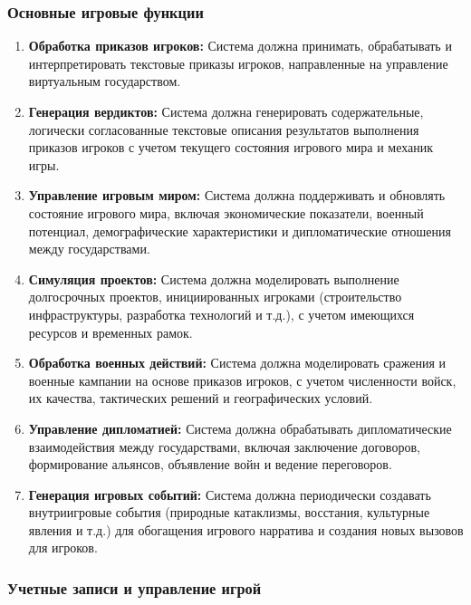 \subsubsection{Основные игровые функции}

\begin{enumerate}[label=FR\arabic*.]
    \item \textbf{Обработка приказов игроков:} Система должна принимать, обрабатывать и интерпретировать текстовые приказы игроков, направленные на управление виртуальным государством.

    \item \textbf{Генерация вердиктов:} Система должна генерировать содержательные, логически согласованные текстовые описания результатов выполнения приказов игроков с учетом текущего состояния игрового мира и механик игры.

    \item \textbf{Управление игровым миром:} Система должна поддерживать и обновлять состояние игрового мира, включая экономические показатели, военный потенциал, демографические характеристики и дипломатические отношения между государствами.

    \item \textbf{Симуляция проектов:} Система должна моделировать выполнение долгосрочных проектов, инициированных игроками (строительство инфраструктуры, разработка технологий и т.д.), с учетом имеющихся ресурсов и временных рамок.

    \item \textbf{Обработка военных действий:} Система должна моделировать сражения и военные кампании на основе приказов игроков, с учетом численности войск, их качества, тактических решений и географических условий.

    \item \textbf{Управление дипломатией:} Система должна обрабатывать дипломатические взаимодействия между государствами, включая заключение договоров, формирование альянсов, объявление войн и ведение переговоров.

    \item \textbf{Генерация игровых событий:} Система должна периодически создавать внутриигровые события (природные катаклизмы, восстания, культурные явления и т.д.) для обогащения игрового нарратива и создания новых вызовов для игроков.
\end{enumerate}

\subsubsection{Учетные записи и управление игрой}

